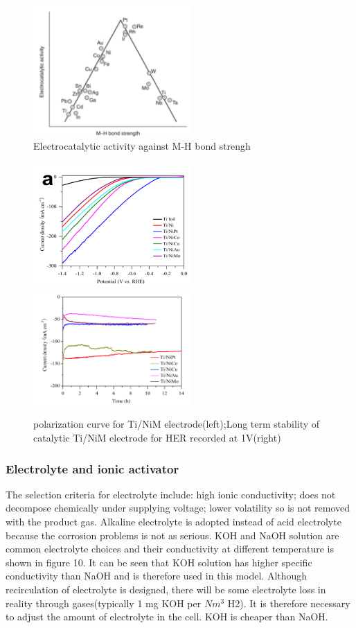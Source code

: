 \begin{figure}[H] 
\centering
\includegraphics[width=6cm]{catalyst.png}
\caption{Electrocatalytic activity against M-H bond strengh\cite{cathode2}}
\end{figure}

\begin{figure}[H] 
\centering
\includegraphics[width=6cm]{polarization.png}
\includegraphics[width=6cm]{stability.png}
\caption{polarization curve for Ti/NiM electrode(left);Long term stability of catalytic Ti/NiM electrode for HER recorded at 1V(right) \cite{cathode}}
\end{figure}


\subsubsection{Electrolyte and ionic activator}
The selection criteria for electrolyte include: high ionic conductivity;  does not decompose chemically under supplying voltage; lower volatility so is not removed with the product gas. Alkaline electrolyte is adopted instead of acid electrolyte because the corrosion problems is not as serious. KOH and NaOH solution are common electrolyte choices and their conductivity at different temperature is shown in figure 10. It can be seen that KOH solution has higher specific conductivity than NaOH and is therefore used in this model. Although recirculation of electrolyte is designed, there will be some electrolyte loss in reality through gases(typically 1 mg KOH per $Nm^3$ H2). It is therefore necessary to adjust the amount of electrolyte in the cell. KOH is cheaper than NaOH.

